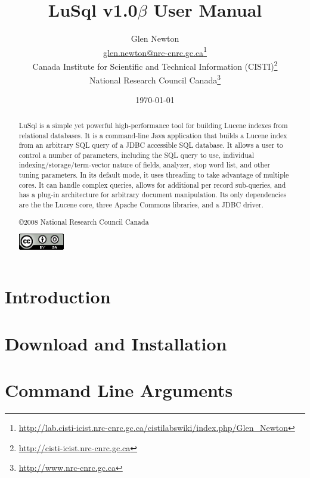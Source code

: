 \documentclass{article}[14pt]
\title{LuSql v1.0$\beta$ User Manual}
\author{Glen Newton \\
  {\ttfamily \href{mailto:glen.newton@nrc-cnrc.gc.ca}{glen.newton@nrc-cnrc.gc.ca}\footnote{\url{http://lab.cisti-icist.nrc-cnrc.gc.ca/cistilabswiki/index.php/Glen_Newton}}
}\\
    Canada Institute for Scientific and Technical Information (CISTI)\footnote{\url{http://cisti-icist.nrc-cnrc.gc.ca}}\\
    National Research Council
    Canada\footnote{\url{http://www.nrc-cnrc.gc.ca}}
  }
\date{\today}
\begin{document}
\maketitle
\begin{abstract}
LuSql is a simple yet powerful high-performance tool for building Lucene
indexes from relational databases. 
It is a command-line Java application that builds a Lucene 
index from an arbitrary SQL query of a JDBC accessible SQL database.
It allows a user to control a number of parameters, including the
SQL query to use,
individual indexing/storage/term-vector nature of fields, 
analyzer, 
stop word list, 
and other tuning parameters.
In its default mode, it uses threading to take advantage of multiple
cores.
It can handle complex queries, allows for additional per record
sub-queries, and has a plug-in architecture for arbitrary document
manipulation.  
Its only dependencies are the the Lucene core, 
three Apache Commons libraries, 
and a JDBC driver.



\thispagestyle{empty}
\vspace*{5cm}
\begin{center}
{\sc \copyright 2008 National Research Council Canada }

\vspace*{5mm}
  \href{http://creativecommons.org/licenses/by-sa/2.5/ca/}{\includegraphics[width=2cm]{images/creativeCommons.png}}
\end{center}

\end{abstract}
\newpage
\tableofcontents
\newpage
\listoffigures
\newpage


\section{Introduction}


\section{Download and Installation}



\section{Command Line Arguments}

\end{document}
